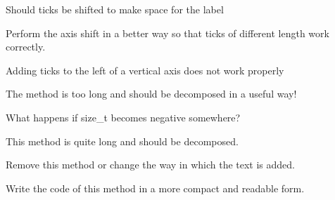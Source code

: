 
\begin{DoxyRefList}
\item[Member \mbox{\hyperlink{class_axis_ab88ead46c702ae993b205ceedaf69e5e}{Axis\texorpdfstring{$<$}{<} T \texorpdfstring{$>$}{>}\+::add\+Label}} (const std\+::string \&label, float position, bool left\+Or\+Below=true, bool rotate\+Label=false)]\label{todo__todo000003}%
%
Should ticks be shifted to make space for the label  
\item[Member \mbox{\hyperlink{class_axis_a3ad4f718066cfb8147aaacc5ec749616}{Axis\texorpdfstring{$<$}{<} T \texorpdfstring{$>$}{>}\+::add\+Ticks}} (const std\+::vector$<$ Tick $>$ \&ticks, bool left\+Or\+Below=true)]\label{todo__todo000004}%
%
Perform the axis shift in a better way so that ticks of different length work correctly. 



Adding ticks to the left of a vertical axis does not work properly  
\item[Member \mbox{\hyperlink{class_axis_ac518d286218478e33dda87bea8ce9f6d}{Axis\texorpdfstring{$<$}{<} T \texorpdfstring{$>$}{>}\+::m\+Add\+Attribute}} (const std\+::vector\texorpdfstring{$<$}{<} \mbox{\hyperlink{class_pixel}{Pixel$<$ T, std\+::string $>$}} \texorpdfstring{$>$}{>} \&attribute, float position, std\+::size\+\_\+t offset\+From\+Axis, bool left\+Or\+Below, std\+::vector$<$ Image\+Coordinate $>$ \&coordinate\+Vector, bool rotate=false)]\label{todo__todo000001}%
%
The method is too long and should be decomposed in a useful way!  
\item[Member \mbox{\hyperlink{class_axis_a4d7fda2635c07c23290a3e9f55595b2f}{Axis\texorpdfstring{$<$}{<} T \texorpdfstring{$>$}{>}\+::m\+Shift}} (std\+::vector$<$ Image\+Coordinate $>$ \&coordinate\+Vector, int horizontal\+Shift, int vertical\+Shift)]\label{todo__todo000002}%
%
What happens if size\+\_\+t becomes negative somewhere?  
\item[Member \mbox{\hyperlink{class_plot2_d_acd22e547d8903adfb1c682dfb84918f9}{Plot2D\texorpdfstring{$<$}{<} T \texorpdfstring{$>$}{>}\+::add\+Data\+Set}} (std\+::shared\+\_\+ptr$<$ const Data\+Set $>$ data\+Set, \mbox{\hyperlink{class_pixel}{Pixel$<$ T, std\+::string $>$}} plot\+Marker)]\label{todo__todo000007}%
%
This method is quite long and should be decomposed.  
\item[Member \mbox{\hyperlink{class_plot2_d_a609838a36eeb52a934e8518117232e95}{Plot2D\texorpdfstring{$<$}{<} T \texorpdfstring{$>$}{>}\+::add\+Text}} (const std\+::string \&text, Image\+Coordinate \&text\+Position)]\label{todo__todo000006}%
%
Remove this method or change the way in which the text is added.  
\item[Member \mbox{\hyperlink{class_plot2_d_ac100a83616ed871dca7030d463746944}{Plot2D\texorpdfstring{$<$}{<} T \texorpdfstring{$>$}{>}\+::m\+Data\+Point\+To\+Coordinate}} (const Data\+Point\+XY \&data\+Point) const]\label{todo__todo000005}%
%
Write the code of this method in a more compact and readable form. 
\end{DoxyRefList}